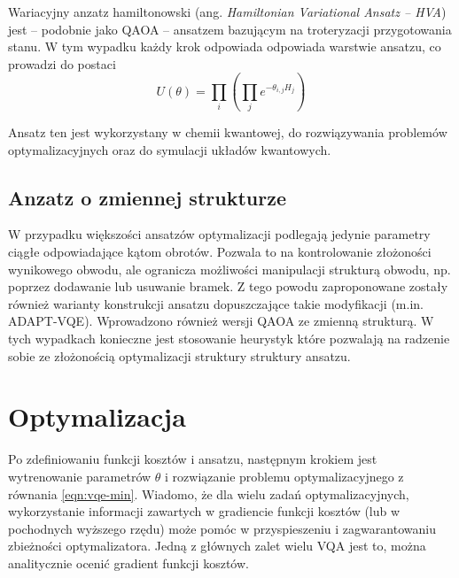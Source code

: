 \documentclass[a4paper,11pt]{article}
\newcommand{\ang}[1]{(ang. \emph{#1})}
\begin{document}
Wariacyjny anzatz hamiltonowski \ang{Hamiltonian Variational Ansatz -- HVA} jest -- podobnie jako QAOA -- ansatzem bazującym na troteryzacji przygotowania stanu. W tym wypadku każdy krok odpowiada odpowiada warstwie ansatzu, co prowadzi do postaci
\begin{equation}
	U(\theta)  = \prod_i \left( \prod_j e^{-\theta_{i,j} H_j} \right)
\end{equation}

 Ansatz ten jest wykorzystany w chemii kwantowej, do rozwiązywania problemów optymalizacyjnych oraz do symulacji układów kwantowych.

\subsection{Anzatz o zmiennej strukturze}

W przypadku większości ansatzów optymalizacji podlegają jedynie parametry ciągłe odpowiadające kątom obrotów. Pozwala to na kontrolowanie złożoności wynikowego obwodu, ale ogranicza możliwości manipulacji strukturą obwodu, np. poprzez dodawanie lub usuwanie bramek. Z tego powodu zaproponowane zostały również warianty konstrukcji ansatzu dopuszczające takie modyfikacji (m.in. ADAPT-VQE). Wprowadzono również wersji QAOA ze zmienną strukturą. W tych wypadkach konieczne jest stosowanie heurystyk które pozwalają na radzenie sobie ze złożonością optymalizacji struktury struktury ansatzu.

\hypertarget{optymalizacja}{%
	\section{Optymalizacja}\label{optymalizacja}}

Po zdefiniowaniu funkcji kosztów i ansatzu, następnym krokiem jest wytrenowanie parametrów $\theta$ i rozwiązanie problemu optymalizacyjnego z równania \ref{eqn:vqe-min}. Wiadomo, że dla wielu zadań optymalizacyjnych, wykorzystanie informacji zawartych w gradiencie funkcji kosztów (lub w pochodnych wyższego rzędu) może pomóc w przyspieszeniu i zagwarantowaniu zbieżności optymalizatora. Jedną z głównych zalet wielu VQA jest to, można analitycznie ocenić gradient funkcji kosztów.
\end{document}
